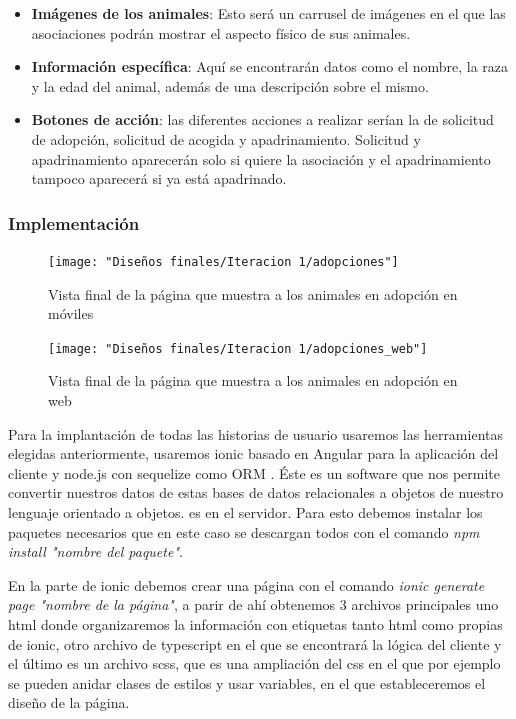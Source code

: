\begin{itemize}
	\item \textbf{Imágenes de los animales}: Esto será un carrusel de imágenes en el que las asociaciones podrán mostrar el aspecto físico de sus animales.
	\item \textbf{Información específica}: Aquí se encontrarán datos como el nombre, la raza y la edad del animal, además de una descripción sobre el mismo.
	\item \textbf{Botones de acción}: las diferentes acciones a realizar serían la de solicitud de adopción, solicitud de acogida y apadrinamiento. Solicitud y apadrinamiento aparecerán solo si quiere la asociación y el apadrinamiento tampoco aparecerá si ya está apadrinado.
\end{itemize}

\subsubsection{Implementación} %

\begin{figure}[H]
	\centering
	\texttt{[image: "Diseños finales/Iteracion 1/adopciones"]}
	\caption{Vista final de la página que muestra a los animales en adopción en móviles}
	\label{fig:adopcionesDef}
\end{figure}


\begin{figure}[H]
	\centering
	\texttt{[image: "Diseños finales/Iteracion 1/adopciones\_web"]}
	\caption{Vista final de la página que muestra a los animales en adopción en web}
	\label{fig:adopcionesDefWeb}
\end{figure}
Para la implantación de todas las historias de usuario usaremos las herramientas elegidas anteriormente, usaremos ionic basado en Angular para la aplicación del cliente y node.js con sequelize como ORM \cite{orm}. Éste es un software que nos permite convertir nuestros datos de estas bases de datos relacionales a objetos de nuestro lenguaje orientado a objetos. es  en el servidor. Para esto debemos instalar los paquetes necesarios que en este caso se descargan todos con el comando \textit{npm install "nombre del paquete"}.

En la parte de ionic debemos crear una página con el comando \textit{ionic generate page "nombre de la página"}, a parir de ahí obtenemos 3 archivos principales uno html donde organizaremos la información con etiquetas tanto html como propias de ionic, otro archivo de typescript en el que se encontrará la lógica del cliente y el último es un archivo scss, que es una ampliación del css en el que por ejemplo se pueden anidar clases de estilos y usar variables, en el que estableceremos el diseño de la página.

